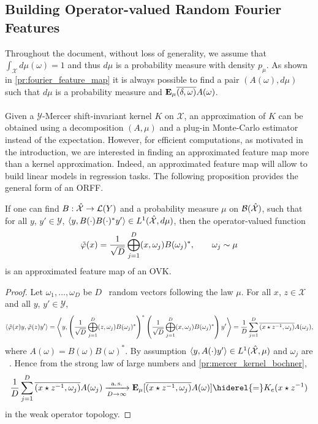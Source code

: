 \subsection{Building Operator-valued Random Fourier Features}
Throughout the document, without loss of generality, we assume that $\int_{\mathcal{X}} d\mu(\omega)=1$ and thus $d\mu$ is a probability measure with density $p_{\mu}$. As shown in \cref{pr:fourier_feature_map} it is always possible to find a pair $(A(\omega), d\mu)$ such that $d\mu$ is a probability measure and ${\text{\textbf{E}}}_\mu{\overline{(\delta,\omega)}A(\omega)}$.
\paragraph{}
Given a $\mathcal{Y}$-Mercer shift-invariant kernel $K$ on $\mathcal{X}$, an approximation of $K$ can be obtained using a decomposition $(A, \mu)$ and a plug-in Monte-Carlo estimator instead of the expectation. However, for efficient computations, as motivated in the introduction, we are interested in finding an approximated feature map more than a kernel approximation. Indeed, an approximated feature map will allow to build linear models in regression tasks. The following proposition provides the general form of an \acl{ORFF}.
\begin{proposition}\label{pr:ORFF-map}If one can find $B: \hat{\mathcal{X}} \to \mathcal{L}(Y)$ and a probability measure $\mu$ on $\mathcal{B}(\hat{\mathcal{X}})$, such that for all $y$, $y'\in\mathcal{Y}$, $\langle y, B(\cdot)B(\cdot)^*y'\rangle \in L^1(\hat{\mathcal{X}}, d\mu)$, then the operator-valued function
\begin{equation}\label{eq:phitilde}
\tildePhi(x)= \frac{1}{\sqrt{D}}\Vect_{j=1}^D\pairing{x, \omega_j}B(\omega_j)^*, \qquad \omega_j \sim \mu
\end{equation}
is an approximated feature map of an \acl{OVK}.
\end{proposition}
\begin{proof}
Let $\omega_1, \ldots, \omega_D$ be $D$ \iid~random vectors following the law $\mu$. For all $x$, $z \in \mathcal{X}$ and all $y$, $y' \in \mathcal{Y}$, 
\begin{dmath*}
\inner*{\tildePhi(x)y,\tildePhi(z)y'}=\inner*{y,\left(\frac{1}{\sqrt{D}}\Vect_{j=1}^D\pairing{z, \omega_j}B(\omega_j)^*\right)^* \left(\frac{1}{\sqrt{D}}\Vect_{j=1}^D\pairing{x, \omega_j}B(\omega_j)^*\right)y'}
= \frac{1}{D} \sum_{j=1}^D \conj{\pairing{x\groupop \inv{z}, \omega_j}}A(\omega_j),
\end{dmath*}
where $A(\omega)=B(\omega)B(\omega)^*$. By assumption $\langle y, A(\cdot)y'\rangle\in L^1(\hat{\mathcal{X}},\mu)$ and $\omega_j$ are \iid~. Hence from the strong law of large numbers and \cref{pr:mercer_kernel_bochner}, 
\begin{dmath*}
\frac{1}{D} \sum_{j=1}^D \conj{\pairing{x\groupop\inv{z},\omega_j}}A(\omega_j)\converges{\asurely}{D\to\infty}\expectation_{\mu}[\conj{\pairing{x\groupop z^{-1},\omega_j}}A(\omega)]\hiderel{=}K_e(x\groupop\inv{z})
\end{dmath*}
in the weak operator topology.
\end{proof}
